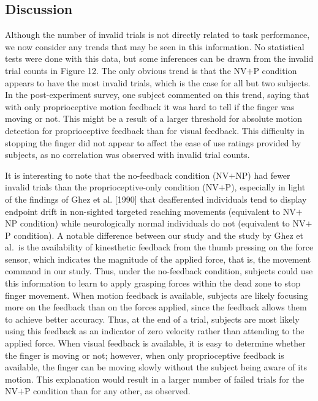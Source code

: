 \documentclass[prodmode,acmtap]{acmlarge}
\begin{document}
\subsection{Discussion}

Although the number of invalid trials is not directly related to task
performance, we now consider any trends that may be seen in this
information. No statistical tests were done with this data, but some
inferences can be drawn from the invalid trial counts in Figure 12.
The only obvious trend is that the NV$+$P condition appears to have
the most invalid trials, which is the case for all but two subjects.
In the post-experiment survey, one subject commented on this trend,
saying that with only proprioceptive motion feedback it was hard to
tell if the finger was moving or not. This might be a result of a
larger threshold for absolute motion detection for proprioceptive
feedback than for visual feedback. This difficulty in stopping the
finger did not appear to affect the ease of use ratings provided by
subjects, as no correlation was observed with invalid trial counts.

It is interesting to note that the no-feedback condition (NV$+$NP)
had fewer invalid trials than the proprioceptive-only condition
(NV$+$P), especially in light of the findings of Ghez et al. [1990]
that deafferented individuals tend to display endpoint drift in
non-sighted targeted reaching movements (equivalent to NV$+$NP
condition) while neurologically normal individuals do not (equivalent
to NV$+$P condition). A notable difference between our study and the
study by Ghez et al.\ is the availability of kinesthetic feedback
from the thumb pressing on the force sensor, which indicates the
magnitude of the applied force, that is, the movement command in our
study. Thus, under the no-feedback condition, subjects could use this
information to learn to apply grasping forces within the dead zone to
stop finger movement. When motion feedback is available, subjects are
likely focusing more on the feedback than on the forces applied,
since the feedback allows them to achieve better accuracy. Thus, at
the end of a trial, subjects are most likely using this feedback as
an indicator of zero velocity rather than attending to the applied
force. When visual feedback is available, it is easy to determine
whether the finger is moving or not; however, when only
proprioceptive feedback is available, the finger can be moving slowly
without the subject being aware of its motion. This explanation would
result in a larger number of failed trials for the NV$+$P condition
than for any other, as observed.
\end{document}
